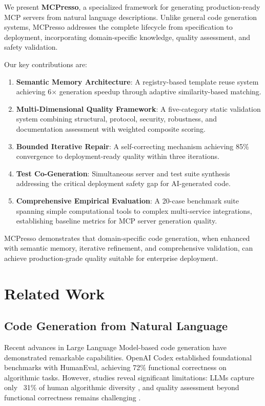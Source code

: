 \documentclass[10pt,twocolumn]{article}
\begin{document}
We present \textbf{MCPresso}, a specialized framework for generating production-ready MCP servers from natural language descriptions. Unlike general code generation systems, MCPresso addresses the complete lifecycle from specification to deployment, incorporating domain-specific knowledge, quality assessment, and safety validation.

Our key contributions are:

\begin{enumerate}
\item \textbf{Semantic Memory Architecture}: A registry-based template reuse system achieving 6× generation speedup through adaptive similarity-based matching.

\item \textbf{Multi-Dimensional Quality Framework}: A five-category static validation system combining structural, protocol, security, robustness, and documentation assessment with weighted composite scoring.

\item \textbf{Bounded Iterative Repair}: A self-correcting mechanism achieving 85\% convergence to deployment-ready quality within three iterations.

\item \textbf{Test Co-Generation}: Simultaneous server and test suite synthesis addressing the critical deployment safety gap for AI-generated code.

\item \textbf{Comprehensive Empirical Evaluation}: A 20-case benchmark suite spanning simple computational tools to complex multi-service integrations, establishing baseline metrics for MCP server generation quality.
\end{enumerate}

MCPresso demonstrates that domain-specific code generation, when enhanced with semantic memory, iterative refinement, and comprehensive validation, can achieve production-grade quality suitable for enterprise deployment.

\section{Related Work}

\subsection{Code Generation from Natural Language}

Recent advances in Large Language Model-based code generation have demonstrated remarkable capabilities. OpenAI Codex \cite{chen2021codex} established foundational benchmarks with HumanEval, achieving 72\% functional correctness on algorithmic tasks. However, studies reveal significant limitations: LLMs capture only ~31\% of human algorithmic diversity \cite{jangra2026diversity}, and quality assessment beyond functional correctness remains challenging \cite{huang2026quality}.
\end{document}
